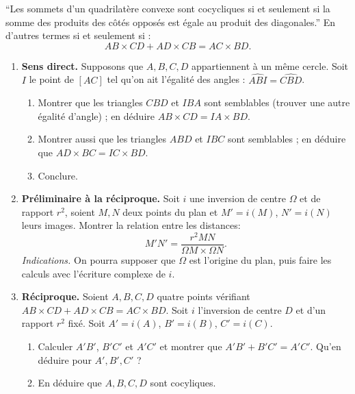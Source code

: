\documentclass[11pt,class=report,crop=false]{standalone}
\newcommand{\inversion}{i}
\begin{document}
\begin{exercicecours}
\label{exo:inversion_ptoleme}


``Les sommets d'un quadrilatère convexe sont cocycliques si et seulement si la somme des produits des côtés opposés est égale au produit des diagonales.''
En d'autres termes si et seulement si : 
$$AB \times CD + AD\times CB = AC \times BD.$$



\begin{enumerate}
 \item \textbf{Sens direct.}
 Supposons que $A, B, C, D$ appartiennent à un même cercle.
 Soit $I$ le point de $[AC]$ tel qu'on ait l'égalité des angles : $\widehat{ABI} = \widehat{CBD}$.
   \begin{enumerate}
     \item Montrer que les triangles $CBD$ et $IBA$ sont semblables (trouver une autre égalité d'angle) ; en déduire
     $AB \times CD = IA \times BD$.
     \item Montrer aussi que les triangles $ABD$ et $IBC$ sont semblables ; en déduire que $AD \times BC = IC \times BD$.
     \item Conclure.
   \end{enumerate}  
   
   
 \item \textbf{Préliminaire à la réciproque.}
 Soit $\inversion$  une inversion de centre $\Omega$ et de rapport $r^2$, soient $M, N$ deux points du plan et
   $M'=\inversion(M)$, $N'=\inversion(N)$ leurs images. Montrer la relation entre les distances:
   $$M'N' = \frac{r^2 MN}{\Omega M \times \Omega N}.$$
   \emph{Indications.} On pourra supposer que $\Omega$ est l'origine du plan, puis faire
   les calculs avec l'écriture complexe de $\inversion$.
   
 \item \textbf{Réciproque.}  
 Soient $A,B,C,D$ quatre points vérifiant $AB \times CD + AD\times CB = AC \times BD.$
  Soit $\inversion$ l'inversion de centre $D$ et d'un rapport $r^2$ fixé. Soit $A'=\inversion(A)$, $B'=\inversion(B)$, 
  $C'=\inversion(C)$.
  \begin{enumerate}
   \item Calculer $A'B'$, $B'C'$ et $A'C'$ et montrer que $A'B'+B'C'=A'C'$. Qu'en déduire pour $A', B', C'$ ?
   \item En déduire que $A,B,C,D$ sont cocyliques.
 \end{enumerate}  
\end{enumerate}
\end{exercicecours}
\end{document}
